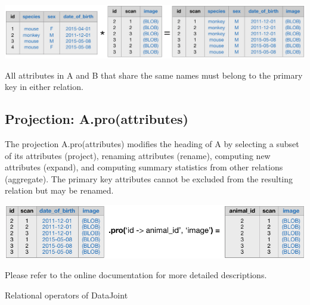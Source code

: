 \begin{table}
\begin{boxedminipage}{\textwidth}
\begin{center}
\includegraphics{./figures/join.pdf}
\end{center}
All attributes in {\sf A} and {\sf B} that share the same names must belong to the primary key in either relation.

\subsection*{Projection: {\sf A.pro(attributes)}}
The projection {\sf A.pro(attributes)} modifies the heading of {\sf A} by selecting a subset of its attributes (project), renaming attributes (rename), computing new attributes (expand), and computing summary statistics from other relations (aggregate).
The primary key attributes cannot be excluded from the resulting relation but may be renamed. 

\begin{center}
\includegraphics{./figures/project.pdf}
\end{center}

Please refer to the online documentation for more detailed descriptions.
\end{boxedminipage}
\caption{Relational operators of DataJoint}
\label{algebra}
\end{table}
